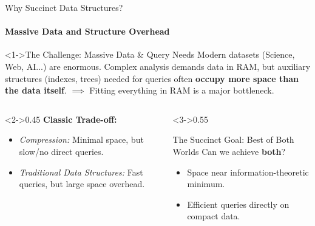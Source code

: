 \begin{frame}{Why Succinct Data Structures?}
    \framesubtitle{Massive Data and Structure Overhead}

    \begin{block}<1->{The Challenge: Massive Data \& Query Needs}
        Modern datasets (Science, Web, AI...) are enormous.
        Complex analysis demands data in RAM, but auxiliary structures (indexes, trees) needed for queries often \textbf{occupy more space than the data itself}.
        $\implies$ Fitting everything in RAM is a major bottleneck.
    \end{block}

    \begin{columns}[T]
        \begin{column}<2->{0.45\textwidth}
            \textbf{Classic Trade-off:}
            \begin{itemize}
                \item \textit{Compression:} Minimal space, but slow/no direct queries.
                \item \textit{Traditional Data Structures:} Fast queries, but large space overhead.
            \end{itemize}
        \end{column}
        \begin{column}<3->{0.55\textwidth}
            \begin{alertblock}{The Succinct Goal: Best of Both Worlds}
                Can we achieve \textbf{both}?
                \begin{itemize}
                    \item Space \alert{near information-theoretic minimum}.
                    \item Efficient queries \alert{directly} on compact data.
                \end{itemize}
            \end{alertblock}
        \end{column}
    \end{columns}
\end{frame}


